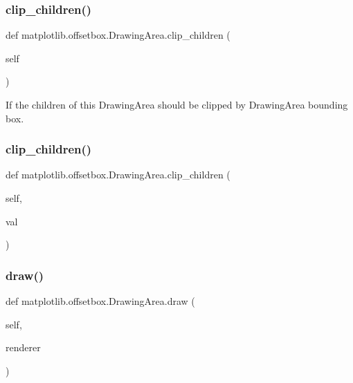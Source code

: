 \subsubsection{\texorpdfstring{clip\+\_\+children()}{clip\_children()}\hspace{0.1cm}{\footnotesize\ttfamily [1/2]}}
{\footnotesize\ttfamily def matplotlib.\+offsetbox.\+Drawing\+Area.\+clip\+\_\+children (\begin{DoxyParamCaption}\item[{}]{self }\end{DoxyParamCaption})}

\begin{DoxyVerb}If the children of this DrawingArea should be clipped
by DrawingArea bounding box.
\end{DoxyVerb}
 \mbox{\label{classmatplotlib_1_1offsetbox_1_1DrawingArea_a87f8c3bc9a53b80d56ef2637192ec69a}} 
\subsubsection{\texorpdfstring{clip\+\_\+children()}{clip\_children()}\hspace{0.1cm}{\footnotesize\ttfamily [2/2]}}
{\footnotesize\ttfamily def matplotlib.\+offsetbox.\+Drawing\+Area.\+clip\+\_\+children (\begin{DoxyParamCaption}\item[{}]{self,  }\item[{}]{val }\end{DoxyParamCaption})}

\mbox{\label{classmatplotlib_1_1offsetbox_1_1DrawingArea_a2d925f7a1b9e7f9d178c6cee73fb122c}} 
\subsubsection{\texorpdfstring{draw()}{draw()}}
{\footnotesize\ttfamily def matplotlib.\+offsetbox.\+Drawing\+Area.\+draw (\begin{DoxyParamCaption}\item[{}]{self,  }\item[{}]{renderer }\end{DoxyParamCaption})}

